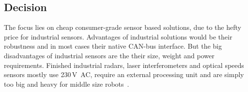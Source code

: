 \documentclass[12pt,a4paper]{article}
\begin{document}
%
%
%

\subsection{Decision}

The focus lies on cheap consumer-grade sensor based solutions, due to the hefty price for industrial sensors.
Advantages of industrial solutions would be their robustness and in most cases their native CAN-bus interface.
But the big disadvantages of industrial sensors are the their size, weight and power requirements.
Finished industrial radars, laser interferometers and optical speeds sensors mostly use 230\,V~AC, require an external processing unit and are simply too big and heavy for middle size robots~\cite{laser_vel, opt_vel, s_r_radar}.
\end{document}
